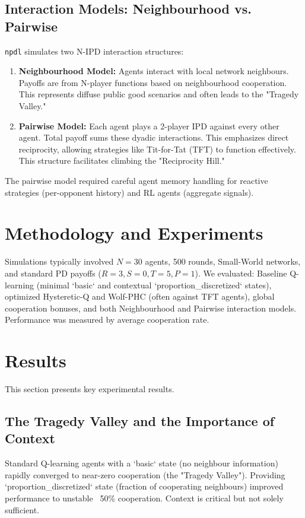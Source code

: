 \documentclass[]{llncs} %
\begin{document}
\subsection{Interaction Models: Neighbourhood vs. Pairwise}
\texttt{npdl} simulates two N-IPD interaction structures:
\begin{enumerate}
    \item \textbf{Neighbourhood Model:} Agents interact with local network neighbours. Payoffs are from N-player functions based on neighbourhood cooperation. This represents diffuse public good scenarios and often leads to the "Tragedy Valley."

    \item \textbf{Pairwise Model:} Each agent plays a 2-player IPD against every other agent. Total payoff sums these dyadic interactions. This emphasizes direct reciprocity, allowing strategies like Tit-for-Tat (TFT) to function effectively. This structure facilitates climbing the "Reciprocity Hill."
\end{enumerate}
The pairwise model required careful agent memory handling for reactive strategies (per-opponent history) and RL agents (aggregate signals).

\section{Methodology and Experiments}
\label{sec:methodology}
Simulations typically involved $N=30$ agents, 500 rounds, Small-World networks, and standard PD payoffs ($R=3, S=0, T=5, P=1$).
We evaluated: Baseline Q-learning (minimal `basic` and contextual `proportion_discretized` states), optimized Hysteretic-Q and Wolf-PHC (often against TFT agents), global cooperation bonuses, and both Neighbourhood and Pairwise interaction models. Performance was measured by average cooperation rate.

\section{Results}
\label{sec:results}
This section presents key experimental results.

\subsection{The Tragedy Valley and the Importance of Context}
Standard Q-learning agents with a `basic` state (no neighbour information) rapidly converged to near-zero cooperation (the "Tragedy Valley").
Providing `proportion_discretized` state (fraction of cooperating neighbours) improved performance to unstable ~50\% cooperation. Context is critical but not solely sufficient.
\end{document}
